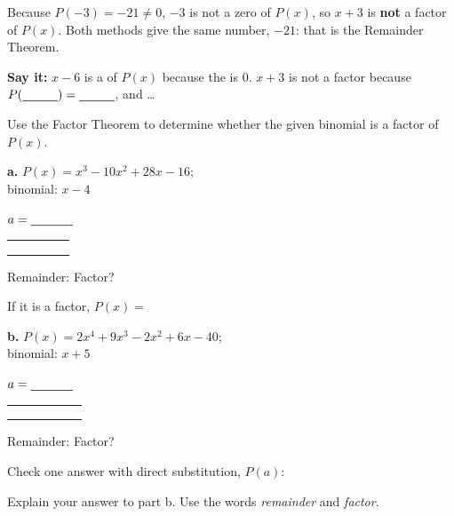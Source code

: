 \vspace{4pt}
Because $P(-3)=-21\neq0$, $-3$ is not a zero of $P(x)$, so $x+3$ is \textbf{not} a factor of $P(x)$. Both methods give the same number, $-21$: that is the Remainder Theorem.

\textbf{Say it:} $x-6$ is a \blank[2cm] of $P(x)$ because the \blank[2.2cm] is $0$. $x+3$ is not a factor because $P(\blank[1cm])=\blank[1cm]$, and \dots
\lines[2]

Use the Factor Theorem to determine whether the given binomial is a factor of $P(x)$.

\begin{minipage}[t]{0.47\textwidth}
\vspace{0pt}
\textbf{a.} $P(x)=x^3-10x^2+28x-16$;\\ binomial: $x-4$

$a=\blank[1.2cm]$

\begin{tabular}{A|CCCC}
\sdstrut\phantom{-1} & & & & \\
\sdstrut & & & & \\ 
\sdstrut & & & & \\
\end{tabular}

\vspace{4pt}
Remainder: \blank[1.4cm] \quad Factor? \blank[1.4cm]

If it is a factor, $P(x)=$
\lines[1]
\end{minipage}\hfill
\begin{minipage}[t]{0.50\textwidth}
\vspace{0pt}
\textbf{b.} $P(x)=2x^4+9x^3-2x^2+6x-40$;\\ binomial: $x+5$

$a=\blank[1.2cm]$

\begin{tabular}{A|CCCCC}
\sdstrut\phantom{-1} & & & & & \\
\sdstrut & & & & & \\ 
\sdstrut & & & & & \\
\end{tabular}

\vspace{4pt}
Remainder: \blank[1.4cm] \quad Factor? \blank[1.4cm]

Check one answer with direct substitution, $P(a)$:
\lines[1]
\end{minipage}

Explain your answer to part b. Use the words \emph{remainder} and \emph{factor}.\lines[2]

